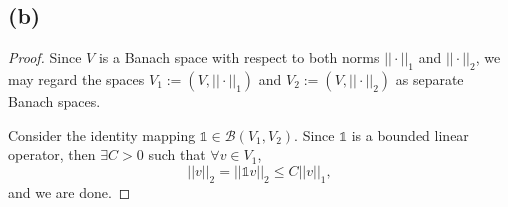 \documentclass{article}
\begin{document}
\subsection*{(b)}
\begin{proof}
	Since $V$ is a Banach space with respect to both norms $||\cdot||_1$ and $||\cdot||_2$, we may regard the spaces $V_1 := (V, ||\cdot||_1)$ and $V_2 := (V, ||\cdot||_2)$ as separate Banach spaces.
	
	Consider the identity mapping $\mathds{1} \in \mathcal{B}(V_1, V_2)$. Since $\mathds{1}$ is a bounded linear operator, then $\exists C > 0$ such that $\forall v \in V_1$,
	\begin{equation}
		||v||_2 = ||\mathds{1} v||_2 \leq C ||v||_1,
	\end{equation}
	and we are done.
\end{proof}
\end{document}
